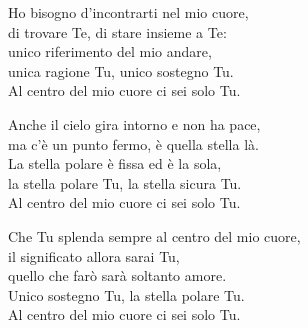 
\strofa Ho bisogno d'incontrarti nel mio cuore,\\
di trovare Te, di stare insieme a Te:\\
unico riferimento del mio andare,\\
unica ragione Tu, unico sostegno Tu.\\
Al centro del mio cuore ci sei solo Tu.

\spazio

\strofa Anche il cielo gira intorno e non ha pace,\\
ma c'è un punto fermo, è quella stella là.\\
La stella polare è fissa ed è la sola,\\
la stella polare Tu, la stella sicura Tu.\\
Al centro del mio cuore ci sei solo Tu.

\spazio


\spazio

\strofa Che Tu splenda sempre al centro del mio cuore,\\
il significato allora sarai Tu,\\
quello che farò sarà soltanto amore.\\
Unico sostegno Tu, la stella polare Tu.\\
Al centro del mio cuore ci sei solo Tu.

\spazio

